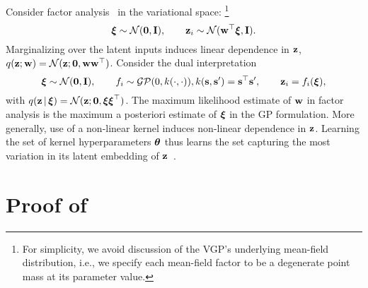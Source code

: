 Consider factor analysis~\citep{tipping1999probabilistic} in the
variational space:
\footnote{\label{footnote:degenerate_mf}
For simplicity, we avoid discussion of the \gls{VGP}'s underlying
mean-field distribution, i.e., we specify each mean-field factor
to be a degenerate point mass at its parameter value.
}
\begin{equation*}
\boldsymbol{\mathbf{\xi}} \sim \mathcal{N}(\boldsymbol{\mathbf{0}}, \boldsymbol{\mathbf{I}}),
\qquad
\boldsymbol{\mathbf{z}}_i \sim \mathcal{N}(\boldsymbol{\mathbf{w}}^\top\boldsymbol{\mathbf{\xi}}, \boldsymbol{\mathbf{I}}).
\end{equation*}
Marginalizing over the latent inputs induces
linear dependence in $\boldsymbol{\mathbf{z}}$,
$q(\boldsymbol{\mathbf{z}};\boldsymbol{\mathbf{w}})=\mathcal{N}(\boldsymbol{\mathbf{z}}; \boldsymbol{\mathbf{0}},\boldsymbol{\mathbf{w}}\boldsymbol{\mathbf{w}}^\top)$.
Consider the dual interpretation
\begin{equation*}
\mbxi \sim \mathcal{N}(\mbzero, \mbI),
\qquad
f_i \sim \mathcal{GP}(0,k(\cdot,\cdot)),%
k(\mbs,\mbs')=\mbs^\top\mbs',
\qquad
\mbz_i=f_i(\mbxi),
\end{equation*}
with
$q(\boldsymbol{\mathbf{z}}\,|\,\boldsymbol{\mathbf{\xi}}) = \mathcal{N}(\boldsymbol{\mathbf{z}}; \boldsymbol{\mathbf{0}},\boldsymbol{\mathbf{\xi}}\boldsymbol{\mathbf{\xi}}^\top)$.
The maximum likelihood estimate of $\boldsymbol{\mathbf{w}}$ in factor analysis is the
maximum a posteriori estimate of $\boldsymbol{\mathbf{\xi}}$ in the \gls{GP} formulation.
More generally, use of a non-linear kernel induces non-linear
dependence in $\boldsymbol{\mathbf{z}}$.
Learning the set of kernel hyperparameters $\boldsymbol{\mathbf{\theta}}$ thus learns the set
capturing the most variation in its
latent embedding of $\boldsymbol{\mathbf{z}}$~\citep{lawrence2005probabilistic}.



\section{Proof of }
\label{appendix:zero}

